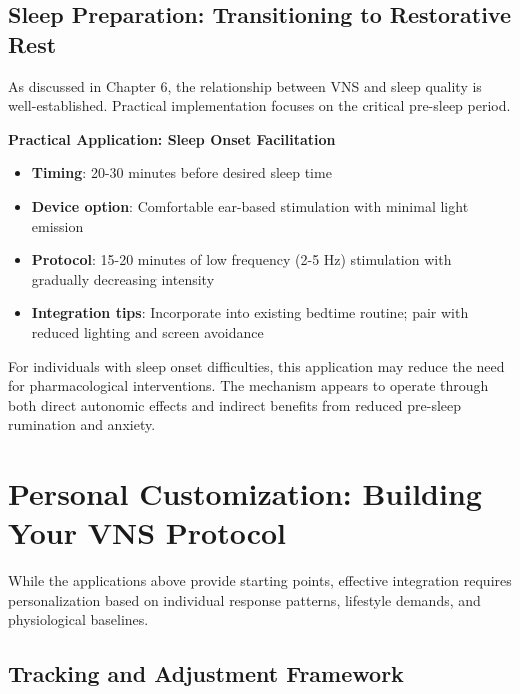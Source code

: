 \documentclass[
  Letterpaper,
]{scrbook}
\providecommand{\tightlist}{%
  \setlength{\itemsep}{0pt}\setlength{\parskip}{0pt}}\usepackage{longtable,booktabs,array}
\begin{document}
\subsection{Sleep Preparation: Transitioning to Restorative
Rest}\label{sleep-preparation-transitioning-to-restorative-rest}

As discussed in Chapter 6, the relationship between VNS and sleep
quality is well-established. Practical implementation focuses on the
critical pre-sleep period.

\textbf{Practical Application: Sleep Onset Facilitation}

\begin{itemize}
\tightlist
\item
  \textbf{Timing}: 20-30 minutes before desired sleep time
\item
  \textbf{Device option}: Comfortable ear-based stimulation with minimal
  light emission
\item
  \textbf{Protocol}: 15-20 minutes of low frequency (2-5 Hz) stimulation
  with gradually decreasing intensity
\item
  \textbf{Integration tips}: Incorporate into existing bedtime routine;
  pair with reduced lighting and screen avoidance
\end{itemize}

For individuals with sleep onset difficulties, this application may
reduce the need for pharmacological interventions. The mechanism appears
to operate through both direct autonomic effects and indirect benefits
from reduced pre-sleep rumination and anxiety.

\section{Personal Customization: Building Your VNS
Protocol}\label{personal-customization-building-your-vns-protocol}

While the applications above provide starting points, effective
integration requires personalization based on individual response
patterns, lifestyle demands, and physiological baselines.

\subsection{Tracking and Adjustment
Framework}\label{tracking-and-adjustment-framework}
\end{document}
